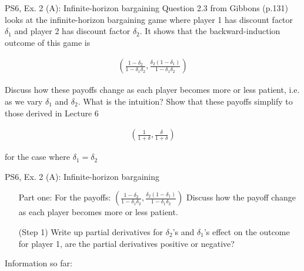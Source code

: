 \begin{frame}{PS6, Ex. 2 (A): Infinite-horizon bargaining}
Question 2.3 from Gibbons (p.131) looks at the infinite-horizon bargaining game where player 1 has discount factor $\delta_1$ and player 2 has discount factor $\delta_2$. It shows that the backward-induction outcome of this game is

\begin{align}
    \left( \frac{1-\delta_2}{1-\delta_1\delta_2},\frac{\delta_2(1-\delta_1)}{1-\delta_1\delta_2}\right)
\end{align}

Discuss how these payoffs change as each player becomes more or less patient, i.e. as we vary $\delta_1$ and $\delta_2$. What is the intuition? Show that these payoffs simplify to those derived in Lecture 6

\begin{align}
\left(\frac{1}{1+\delta},\frac{\delta}{1+\delta}\right)
\end{align}

for the case where $\delta_1=\delta_2$
\vfill\null
\end{frame}


\begin{frame}{PS6, Ex. 2 (A): Infinite-horizon bargaining}
    \begin{itemize}
    \item[Part one:] For the payoffs: $ \left( \frac{1-\delta_2}{1-\delta_1\delta_2},\frac{\delta_2(1-\delta_1)}{1-\delta_1\delta_2}\right)$ Discuss how the payoff change as each player becomes more or less patient.
    \end{itemize}
    \vfill\null
  \begin{multicols}{2}
    \begin{itemize}
      \item[(Step 1)] Write up partial derivatives for $\delta_2$'s and $\delta_1$'s effect on the outcome for player 1, are the partial derivatives positive or negative?
      \end{itemize}
    \vfill\null \columnbreak
    Information so far:
    \begin{itemize}
    \item[]
    \end{itemize}
    \vfill\null
  \end{multicols}
    \vfill\null
\end{frame}

